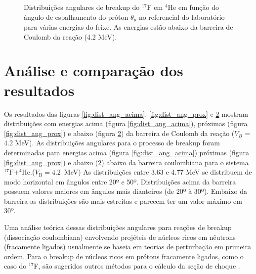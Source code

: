 \documentclass[a4paper,12pt,oneside]{book}
\begin{document}
\begin{figure}[H]
\begin{subfigure}[b]{0.48\textwidth}
        \caption{}
        \label{subfig:dist_ang_ab}
    \end{subfigure}
\caption{Distribuições angulares de breakup do $^{17}$F em $^4$He em função do ângulo de espalhamento do próton $\theta_p$ no referencial do laboratório para várias energias do feixe. As energias estão abaixo da barreira de Coulomb da reação (4.2 MeV).}
\label{fig:dist_ang_abaixo}
\end{figure}
\section{Análise e comparação dos resultados}

\par Os resultados das figuras \ref{fig:dist_ang_acima}, \ref{fig:dist_ang_prox} e \ref{fig:dist_ang_abaixo} mostram distribuições com energias acima (figura \ref{fig:dist_ang_acima}), próximas (figura \ref{fig:dist_ang_prox}) e abaixo (figura \ref{fig:dist_ang_abaixo}) da barreira de Coulomb da reação ($V_B$ = 4.2 MeV). As distribuições angulares para o processo de breakup foram determinadas para energias acima (figura \ref{fig:dist_ang_acima}) próximas (figura \ref{fig:dist_ang_prox}) e abaixo (\ref{fig:dist_ang_abaixo}) abaixo da barreira coulombiana para o sistema $^{17}\mathrm{F}+^{4}\mathrm{He}$.($V_\mathrm{B}=4.2$~MeV) As distribuições entre 3.63 e 4.77 MeV se distribuem de modo horizontal em ângulos entre 20º e 50º. Distribuições acima da barreira possuem valores maiores em ângulos mais dianteiros (de 20º à 30º). Embaixo da barreira as distribuições são mais estreitas e parecem ter um valor máximo em 30º.

\par Uma análise teórica dessas distribuições angulares para reações de breakup (dissociação coulombiana) envolvendo projéteis de núcleos ricos em nêutrons (fracamente ligados) usualmente se baseia em teorias de perturbação em primeira ordem. Para o breakup de núcleos ricos em prótons fracamente ligados, como o caso do $^{17}$F, são sugeridos outros métodos para o cálculo da seção de choque \cite{LIANG200922, BERTULANI2003199}.
\end{document}
